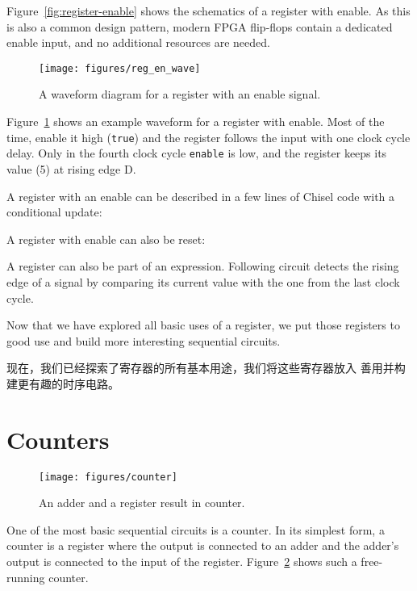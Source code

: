 \documentclass[%
    10pt,
    headinclude, footexclude,
    openright, %
    notitlepage,
    cleardoubleempty,
    headsepline,
    pointlessnumbers,
    bibtotoc, idxtotoc,
    ]{scrbook}
\newcommand{\code}[1]{{\small{\texttt{#1}}}}
\newcommand{\scale}{0.7}
\begin{document}
Figure~\ref{fig:register-enable} shows the schematics of a register with enable.
As this is also a common design pattern, modern FPGA flip-flops contain a
dedicated enable input, and no additional resources are needed.

\begin{figure}
  \centering
  \texttt{[image: figures/reg\_en\_wave]}
  \caption{A waveform diagram for a register with an enable signal.}
  \label{fig:register-en-wave}
\end{figure}

Figure~\ref{fig:register-en-wave} shows an example waveform for a register
with enable. Most of the time, enable it high (\code{true}) and the register
follows the input with one clock cycle delay. Only in the fourth clock cycle
\code{enable} is low, and the register keeps its value (5) at rising edge D.

A register with an enable can be described in a few lines of Chisel code
with a conditional update:


\noindent A register with enable can also be reset:


A register can also be part of an expression. Following circuit detects the rising edge
of a signal by comparing its current value with the one from the last clock cycle.


Now that we have explored all basic uses of a register, we put those registers to
good use and build more interesting sequential circuits.


现在，我们已经探索了寄存器的所有基本用途，我们将这些寄存器放入
善用并构建更有趣的时序电路。

\section{Counters}
\label{sec:counter}

\begin{figure}
  \centering
  \texttt{[image: figures/counter]}
  \caption{An adder and a register result in counter.}
  \label{fig:counter}
\end{figure}

One of the most basic sequential circuits is a counter. In its simplest form, a counter is a register
where the output is connected to an adder and the adder's output is connected to the input
of the register. Figure~\ref{fig:counter} shows such a free-running counter.
\end{document}
